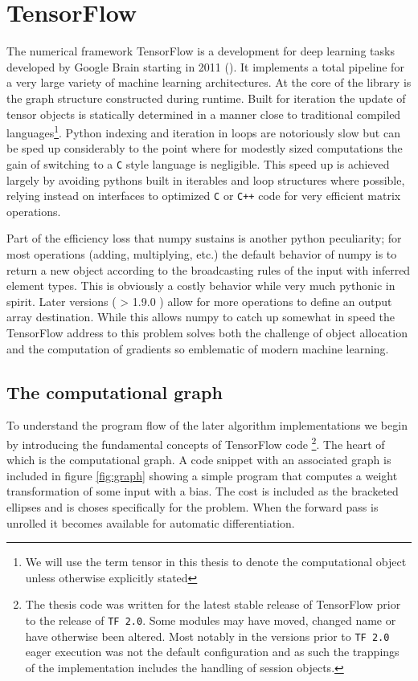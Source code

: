 \section{TensorFlow}\label{sec:TensorFlow}

The numerical framework TensorFlow is a development for deep learning tasks developed by Google Brain starting in 2011 (\cite{tensorflow}). It implements a total pipeline for a very large variety of machine learning architectures. At the core of the library is the graph structure constructed during runtime. Built for iteration the update of tensor objects is statically determined in a manner close to traditional compiled languages\footnote{We will use the term tensor in this thesis to denote the computational object unless otherwise explicitly stated}. Python indexing and iteration in loops are notoriously slow but can be sped up considerably to the point where for modestly sized computations the gain of switching to a \lstinline{C} style language is negligible. This speed up is achieved largely by avoiding pythons built in iterables and loop structures where possible, relying instead on interfaces to optimized \lstinline{C} or \lstinline{C++} code for very efficient matrix operations.

Part of the efficiency loss that numpy sustains is another python peculiarity; for most operations (adding, multiplying, etc.) the default behavior of numpy is to return a new object according to the broadcasting rules of the input with inferred element types. This is obviously a costly behavior while very much pythonic in spirit. Later versions ( > 1.9.0 ) allow for more operations to define an output array destination. While this allows numpy to catch up somewhat in speed the TensorFlow address to this problem solves both the challenge of object allocation and the computation of gradients so emblematic of modern machine learning.

\subsection{The computational graph}

To understand the program flow of the later algorithm implementations we begin by introducing the fundamental concepts of TensorFlow code \footnote{The thesis code was written for the latest stable release of TensorFlow prior to the release of \lstinline{TF 2.0}. Some modules may have moved, changed name or have otherwise been altered. Most notably in the versions prior to \lstinline{TF 2.0} eager execution was not the default configuration and as such the trappings of the implementation includes the handling of session objects.}. The heart of which is the computational graph. A code snippet with an associated graph is included in figure \ref{fig:graph} showing a simple program that computes a weight transformation of some input with a bias. The cost is included as the bracketed ellipses and is choses specifically for the problem. When the forward pass is unrolled it becomes available for automatic differentiation. 

